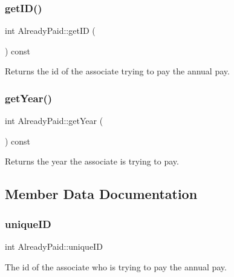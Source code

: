 \subsubsection{\texorpdfstring{get\+I\+D()}{getID()}}
{\footnotesize\ttfamily int Already\+Paid\+::get\+ID (\begin{DoxyParamCaption}{ }\end{DoxyParamCaption}) const\hspace{0.3cm}{\ttfamily [inline]}}



Returns the id of the associate trying to pay the annual pay. 

\mbox{\label{classAlreadyPaid_a9bc932f3c57052ce0508abc48b5a5a6c}} 
\subsubsection{\texorpdfstring{get\+Year()}{getYear()}}
{\footnotesize\ttfamily int Already\+Paid\+::get\+Year (\begin{DoxyParamCaption}{ }\end{DoxyParamCaption}) const\hspace{0.3cm}{\ttfamily [inline]}}



Returns the year the associate is trying to pay. 



\subsection{Member Data Documentation}
\mbox{\label{classAlreadyPaid_ad5c108176759cfd9d2f9ca2dd143d843}} 
\subsubsection{\texorpdfstring{unique\+ID}{uniqueID}}
{\footnotesize\ttfamily int Already\+Paid\+::unique\+ID\hspace{0.3cm}{\ttfamily [private]}}



The id of the associate who is trying to pay the annual pay. 

